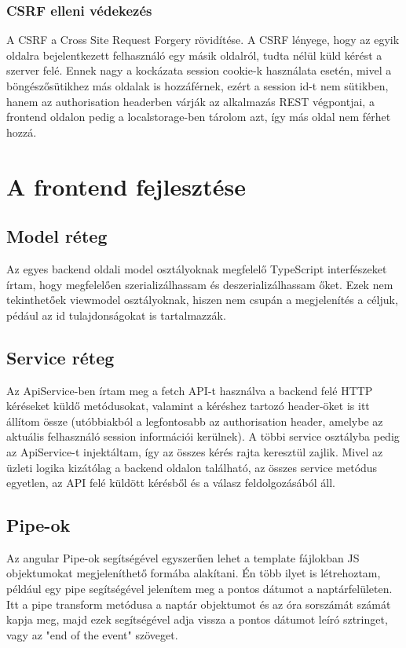\documentclass[a4paper,12pt]{report}
\theoremstyle{definition}
\theoremstyle{remark}
\begin{document}
	\subsection{CSRF elleni védekezés}

A CSRF a Cross Site Request Forgery rövidítése. A CSRF lényege, hogy az egyik oldalra bejelentkezett felhasználó egy másik oldalról, tudta nélül küld kérést a szerver felé. Ennek nagy a kockázata session cookie-k használata esetén, mivel a böngészősütikhez más oldalak is hozzáférnek, ezért a session id-t nem sütikben, hanem az authorisation headerben várják az alkalmazás REST végpontjai, a frontend oldalon pedig a localstorage-ben tárolom azt, így más oldal nem férhet hozzá.

\chapter{A frontend fejlesztése}

\section{Model réteg}

Az egyes backend oldali model osztályoknak megfelelő TypeScript interfészeket írtam, hogy megfelelően szerializálhassam és deszerializálhassam őket. Ezek nem tekinthetőek viewmodel osztályoknak, hiszen nem csupán a megjelenítés a céljuk, pédául az id tulajdonságokat is tartalmazzák.

\section{Service réteg}

Az ApiService-ben írtam meg a fetch API-t használva a backend felé HTTP kéréseket küldő metódusokat, valamint a kéréshez tartozó header-öket is itt állítom össze (utóbbiakból a legfontosabb az authorisation header, amelybe az aktuális felhasználó session információi kerülnek). A többi service osztályba pedig az ApiService-t injektáltam, így az összes kérés rajta keresztül zajlik.  Mivel az üzleti logika kizátólag a backend oldalon található, az összes service metódus egyetlen, az API felé küldött kérésből és a válasz feldolgozásából áll.

\section{Pipe-ok}

Az angular Pipe-ok segítségével egyszerűen lehet a template fájlokban JS objektumokat megjeleníthető formába alakítani. Én több ilyet is létrehoztam, például egy pipe segítségével jelenítem meg a pontos dátumot a naptárfelületen. Itt a pipe transform metódusa a naptár objektumot és az óra sorszámát számát kapja meg, majd ezek segítségével adja vissza a pontos dátumot leíró sztringet, vagy az "end of the event" szöveget.
\end{document}
